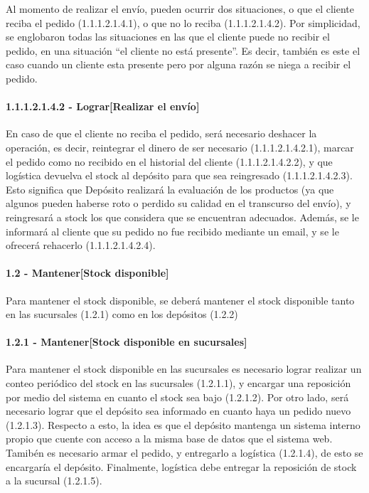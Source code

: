 Al momento de realizar el envío, pueden ocurrir dos situaciones, o que el
cliente reciba el pedido (1.1.1.2.1.4.1), o que no lo reciba (1.1.1.2.1.4.2).
Por simplicidad, se englobaron todas las situaciones en las que el cliente puede
no recibir el pedido, en una situación ``el cliente no está presente''. Es
decir, también es este el caso cuando un cliente esta presente pero por alguna
razón se niega a recibir el pedido.

\paragraph{1.1.1.2.1.4.2 - Lograr[Realizar el envío]} \label{para:1.1.1.2.1.4.2}

En caso de que el cliente no reciba el pedido, será necesario deshacer la
operación, es decir, reintegrar el dinero de ser necesario (1.1.1.2.1.4.2.1),
marcar el pedido como no recibido en el historial del cliente (1.1.1.2.1.4.2.2),
y que logística devuelva el stock al depósito para que sea reingresado
(1.1.1.2.1.4.2.3). Esto significa que Depósito realizará la evaluación de los
productos (ya que algunos pueden haberse roto o perdido su calidad en el
transcurso del envío), y reingresará a stock los que considera que se encuentran
adecuados. Además, se le informará al cliente que su pedido no fue recibido
mediante un email, y se le ofrecerá rehacerlo (1.1.1.2.1.4.2.4).

\clearpage
\paragraph{1.2 - Mantener[Stock disponible]} \label{para:1.2}

Para mantener el stock disponible, se deberá mantener el stock disponible tanto
en las sucursales (1.2.1) como en los depósitos (1.2.2)

\paragraph{1.2.1 - Mantener[Stock disponible en sucursales]} \label{para:1.2.1}

Para mantener el stock disponible en las sucursales es necesario lograr realizar
un conteo periódico del stock en las sucursales (1.2.1.1), y encargar una
reposición por medio del sistema en cuanto el stock sea bajo (1.2.1.2). Por otro
lado, será necesario lograr que el depósito sea informado en cuanto haya un
pedido nuevo (1.2.1.3). Respecto a esto, la idea es que el depósito mantenga un
sistema interno propio que cuente con acceso a la misma base de datos que el
sistema web. Tamibén es necesario armar el pedido, y entregarlo a logística
(1.2.1.4), de esto se encargaría el depósito. Finalmente, logística debe
entregar la reposición de stock a la sucursal (1.2.1.5).


